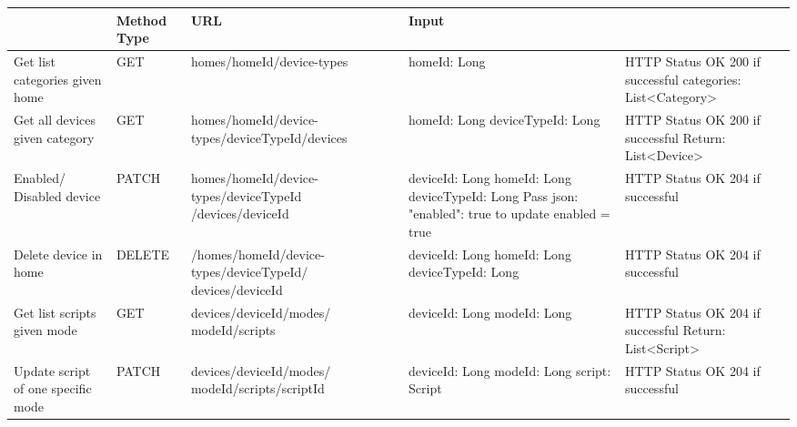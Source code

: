 \documentclass[12pt,a4paper,oneside]{extbook}
\begin{document}
\newcommand\Tstrut{\rule{0pt}{2.6ex}}
{\scriptsize
\begin{longtable}{|>{\raggedright\arraybackslash}p{2.2cm}|p{1.2cm}|p{3.3cm}|p{3cm}|>{\raggedright\arraybackslash}p{4.3cm}|}

\hline 
\multicolumn{1}{|>{\raggedright\arraybackslash}p{2.2cm}|}{\textbf{Page/Function}} & \multicolumn{1}{p{1.2cm}|}{\textbf{Method Type}} & \multicolumn{1}{p{3.3cm}|}{\textbf{URL}} & \multicolumn{1}{p{3cm}|}{\textbf{Input}} & \multicolumn{1}{>{\raggedright\arraybackslash}p{4.3cm}|}{\textbf{Output}}\\ \hline 
\endhead

\hline\Tstrut
Get list categories given home & GET &	homes/{homeId}/device-types	& 
homeId: Long &
HTTP Status OK 200 if successful\newline
categories: List<Category>\\

\hline\Tstrut
Get all devices given category & 	GET &	homes/{homeId}/device-types/{deviceTypeId}/\newline devices &	homeId: Long\newline
deviceTypeId: Long &	HTTP Status OK 200 if successful\newline
Return: List<Device>\\

\hline\Tstrut
Enabled/
Disabled device	& PATCH &	homes/{homeId}/device-types/{deviceTypeId}
/devices/{deviceId} &	
deviceId: Long\newline
homeId: Long\newline
deviceTypeId: Long\newline
Pass json: {"enabled": true}
to update enabled = true &	
HTTP Status OK 204 if successful\\

\hline\Tstrut
Delete device in home &	DELETE &	/homes/{homeId}/device-types/{deviceTypeId}/
devices/{deviceId} &	
deviceId: Long\newline
homeId: Long\newline
deviceTypeId: Long &	HTTP Status OK 204 if successful\\

\hline\Tstrut
Get list scripts given mode	& GET &	devices/{deviceId}/modes/
{modeId}/scripts &	deviceId: Long\newline
modeId: Long &	
HTTP Status OK 204 if successful\newline
Return: List<Script>\\

\hline\Tstrut
Update script of one specific mode &	PATCH &	devices/{deviceId}/modes/
{modeId}/scripts/{scriptId} &	
deviceId: Long\newline
modeId: Long\newline
script: Script &	HTTP Status OK 204 if successful\\


\end{longtable}}
\end{document}
